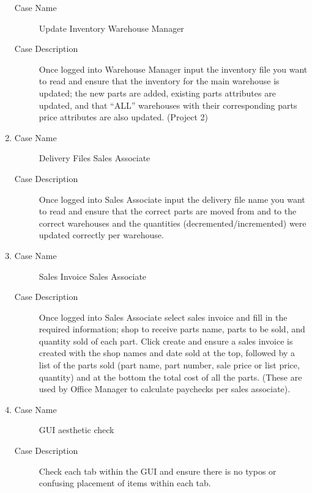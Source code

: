 \documentclass{report}
\begin{document}
\begin{enumerate}
\begin{description}
          \item [Case Name] Update Inventory Warehouse Manager
          \item [Case Description] Once logged into Warehouse Manager input the inventory file you want to read and ensure that the inventory for the main warehouse is updated; the new parts are added, existing parts attributes are updated, and that “ALL” warehouses with their corresponding parts price attributes are also updated. (Project 2)
        \end{description}
  \item \begin{description}
          \item [Case Name] Delivery Files Sales Associate
          \item [Case Description] Once logged into Sales Associate input the delivery file name you want to read and ensure that the correct parts are moved from and to the correct warehouses and the quantities (decremented/incremented) were updated correctly per warehouse.
        \end{description}
  \item \begin{description}
          \item [Case Name] Sales Invoice Sales Associate
          \item [Case Description] Once logged into Sales Associate select sales invoice and fill in the required information; shop to receive parts name, parts to be sold, and quantity sold of each part. Click create and ensure a sales invoice is created with the shop names and date sold at the top, followed by a list of the parts sold (part name, part number, sale price or list price, quantity) and at the bottom the total cost of all the parts. (These are used by Office Manager to calculate paychecks per sales associate).
        \end{description}
  \item \begin{description}
          \item [Case Name] GUI aesthetic check
          \item [Case Description] Check each tab within the GUI and ensure there is no typos or confusing placement of items within each tab.
        \end{description}
\end{enumerate}
\end{document}
